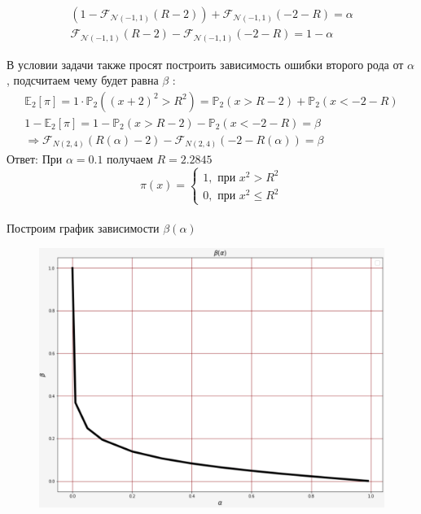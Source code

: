 \documentclass[14pt]{extarticle}
\begin{document}
\begin{gather*}
\left(1-\mathcal{F}_{\mathcal{N}(-1, 1)}(R-2)\right)+\mathcal{F}_{\mathcal{N}(-1, 1)}(-2-R)=\alpha 
\\
\mathcal{F}_{\mathcal{N}(-1, 1)}(R-2)-\mathcal{F}_{\mathcal{N}(-1, 1)}(-2-R)=1-\alpha 
\end{gather*}

В условии задачи также просят построить зависимость ошибки второго рода от $\alpha$, подсчитаем чему будет равна $\beta$ :
\begin{gather*}
\mathbb{E}_2\left[\pi\right]=1 \cdot \mathbb{P}_2\left((x+2)^2>R^2\right)=\mathbb{P}_2(x>R-2)+\mathbb{P}_2(x<-2-R) \\
1-\mathbb{E}_2\left[\pi\right]=1-\mathbb{P}_2(x>R-2)-\mathbb{P}_2(x<-2-R)= \beta \\
\Rightarrow  \mathcal{F}_{N(2,4)}(R(\alpha)-2)-\mathcal{F}_{N(2,4)}(-2-R(\alpha))= \beta
\end{gather*}
Ответ:
При $\alpha=0.1$ получаем $R=2.2845$
\\
$$
\pi(x)=\left\{\begin{array}{l}
1, \text{ при } x^2>R^2 \\
0, \text{ при } x^2 \leqslant R^2
\end{array}\right.
$$
\\
Построим график зависимости $\beta(\alpha)$
\begin{figure}[h]
	{\includegraphics[scale=0.7]{Molodtsov53.png}}
\end{figure}
\end{document}
